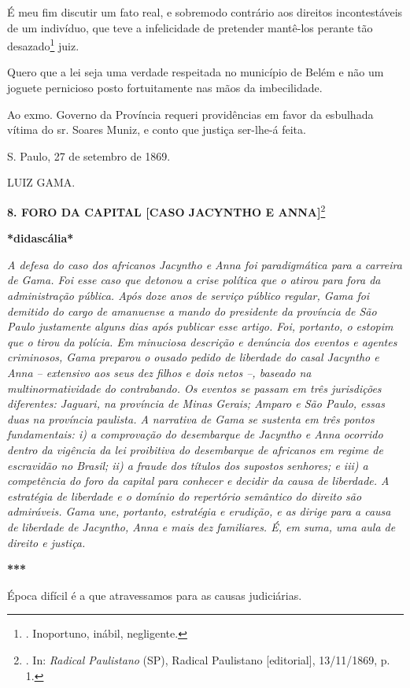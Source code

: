 É meu fim discutir um fato real, e sobremodo contrário aos direitos
incontestáveis de um indivíduo, que teve a infelicidade de pretender
mantê-los perante tão desazado\footnote{. Inoportuno, inábil,
  negligente.} juiz.

Quero que a lei seja uma verdade respeitada no município de Belém e não
um joguete pernicioso posto fortuitamente nas mãos da imbecilidade.

Ao exmo. Governo da Província requeri providências em favor da esbulhada
vítima do sr. Soares Muniz, e conto que justiça ser-lhe-á feita.

S. Paulo, 27 de setembro de 1869.

LUIZ GAMA.

\textbf{8. FORO DA CAPITAL {[}CASO JACYNTHO E ANNA{]}}\footnote{. In:
  \emph{Radical Paulistano} (SP), Radical Paulistano {[}editorial{]},
  13/11/1869, p. 1.}

\textbf{*didascália*}

\emph{A defesa do caso dos africanos Jacyntho e Anna foi paradigmática
para a carreira de Gama. Foi esse caso que detonou a crise política que
o atirou para fora da administração pública. Após doze anos de serviço
público regular, Gama foi demitido do cargo de amanuense a mando do
presidente da província de São Paulo justamente alguns dias após
publicar esse artigo. Foi, portanto, o estopim que o tirou da polícia.
Em minuciosa descrição e denúncia dos eventos e agentes criminosos, Gama
preparou o ousado pedido de liberdade do casal Jacyntho e Anna --
extensivo aos seus dez filhos e dois netos --, baseado na
multinormatividade do contrabando. Os eventos se passam em três
jurisdições diferentes: Jaguari, na província de Minas Gerais; Amparo e
São Paulo, essas duas na província paulista. A narrativa de Gama se
sustenta em três pontos fundamentais: i) a comprovação do desembarque de
Jacyntho e Anna ocorrido dentro da vigência da lei proibitiva do
desembarque de africanos em regime de escravidão no Brasil; ii) a fraude
dos títulos dos supostos senhores; e iii) a competência do foro da
capital para conhecer e decidir da causa de liberdade. A estratégia de
liberdade e o domínio do repertório semântico do direito são admiráveis.
Gama une, portanto, estratégia e erudição, e as dirige para a causa de
liberdade de Jacyntho, Anna e mais dez familiares. É, em suma, uma aula
de direito e justiça.}

\textbf{***}

Época difícil é a que atravessamos para as causas judiciárias.

